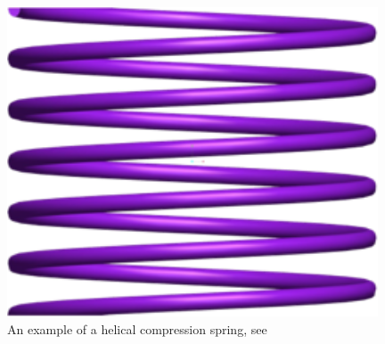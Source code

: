 \documentclass[10pt]{article}
\begin{document}
		\begin{figure}[h]
		 \begin{center}\includegraphics[scale=.2]{Spring.png}\end{center}
		 \caption{An example of a helical compression spring, see \cite{Massad2015}}
		 \label{Spring}
		 
		 \end{figure}
\end{document}
